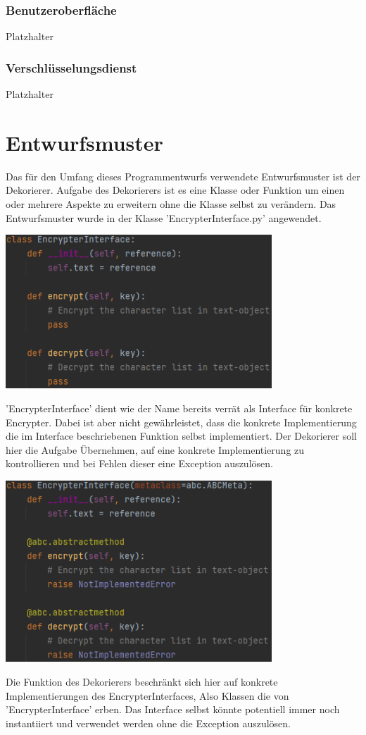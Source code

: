 \documentclass[12pt]{article}
\begin{document}
\subsubsection{Benutzeroberfläche}
Platzhalter

\subsubsection{Verschlüsselungsdienst}
Platzhalter

\newpage

\section{Entwurfsmuster}
Das für den Umfang dieses Programmentwurfs verwendete Entwurfsmuster ist der Dekorierer. Aufgabe des Dekorierers ist es eine Klasse oder Funktion um einen oder mehrere Aspekte zu erweitern ohne die Klasse selbst zu verändern. Das Entwurfsmuster wurde in der Klasse 'EncrypterInterface.py' angewendet.
\begin{center}
	\includegraphics[width=10cm]{bilder/Decorator_before.png}
\end{center}
'EncrypterInterface' dient wie der Name bereits verrät als Interface für konkrete Encrypter. Dabei ist aber nicht gewährleistet, dass die konkrete Implementierung die im Interface beschriebenen Funktion selbst implementiert. Der Dekorierer soll hier die Aufgabe Übernehmen, auf eine konkrete Implementierung zu kontrollieren und bei Fehlen dieser eine Exception auszulösen.
\begin{center}
	\includegraphics[width=10cm]{bilder/Decorator_after.png}
\end{center}
Die Funktion des Dekorierers beschränkt sich hier auf konkrete Implementierungen des EncrypterInterfaces, Also Klassen die von 'EncrypterInterface' erben. Das Interface selbst könnte potentiell immer noch instantiiert und verwendet werden ohne die Exception auszulösen.
\end{document}
